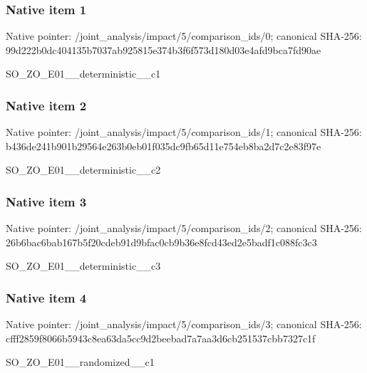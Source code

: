 \documentclass[10pt,a4paper]{article}
\begin{document}
\subsubsection{Native item 1}
Native pointer: /joint\_\allowbreak{}analysis/impact/5/comparison\_\allowbreak{}ids/0; canonical SHA-256: 99d222b0dc404135b7037ab925815e374b3f6f573d180d03e4afd9bca7fd90ae

\begingroup\raggedright\sloppy SO\_\allowbreak{}ZO\_\allowbreak{}E01\_\allowbreak{}\_\allowbreak{}deterministic\_\allowbreak{}\_\allowbreak{}c1\par\endgroup

\subsubsection{Native item 2}
Native pointer: /joint\_\allowbreak{}analysis/impact/5/comparison\_\allowbreak{}ids/1; canonical SHA-256: b436de241b901b29564e263b0eb01f035dc9fb65d11e754eb8ba2d7c2e83f97e

\begingroup\raggedright\sloppy SO\_\allowbreak{}ZO\_\allowbreak{}E01\_\allowbreak{}\_\allowbreak{}deterministic\_\allowbreak{}\_\allowbreak{}c2\par\endgroup

\subsubsection{Native item 3}
Native pointer: /joint\_\allowbreak{}analysis/impact/5/comparison\_\allowbreak{}ids/2; canonical SHA-256: 26b6bac6bab167b5f20cdeb91d9bfac0cb9b36e8fcd43ed2e5badf1c088fc3c3

\begingroup\raggedright\sloppy SO\_\allowbreak{}ZO\_\allowbreak{}E01\_\allowbreak{}\_\allowbreak{}deterministic\_\allowbreak{}\_\allowbreak{}c3\par\endgroup

\subsubsection{Native item 4}
Native pointer: /joint\_\allowbreak{}analysis/impact/5/comparison\_\allowbreak{}ids/3; canonical SHA-256: cfff2859f8066b5943c8ea63da5cc9d2beebad7a7aa3d6cb251537cbb7327c1f

\begingroup\raggedright\sloppy SO\_\allowbreak{}ZO\_\allowbreak{}E01\_\allowbreak{}\_\allowbreak{}randomized\_\allowbreak{}\_\allowbreak{}c1\par\endgroup
\end{document}
